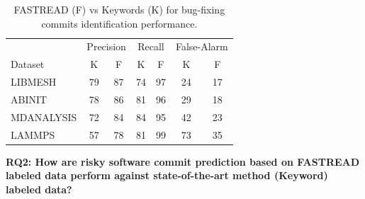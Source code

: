 \documentclass[sigconf,review, anonymous]{acmart}
\begin{document}
\begin{table}[!t]
\caption{FASTREAD (F) vs Keywords (K) for bug-fixing commits identification performance.}
\label{tab:rq1}
\begin{center}
\setlength\tabcolsep{10pt}
\begin{tabular}{ l|c|c|c|c|c|c }
 \multicolumn{1}{c|}{} & \multicolumn{2}{c|}{Precision} & \multicolumn{2}{c|}{Recall} & \multicolumn{2}{c}{False-Alarm}\\
\cline{2-7}
 Dataset & K & F & K & F & K & F \\
\hline
LIBMESH & 79 & 87 & 74 & 97 & 24 & 17 \\
ABINIT & 78 & 86 &  81 & 96 & 29 & 18 \\
MDANALYSIS & 72 & 84  & 84 & 95 & 42 & 23 \\
LAMMPS & 57 & 78  & 81 & 99 & 73 & 35 \\
\end{tabular}
\end{center}
\end{table}



\textbf{RQ2: { How are risky software commit prediction based on FASTREAD labeled data perform against state-of-the-art method (Keyword) labeled data?}}
 
\end{document}
